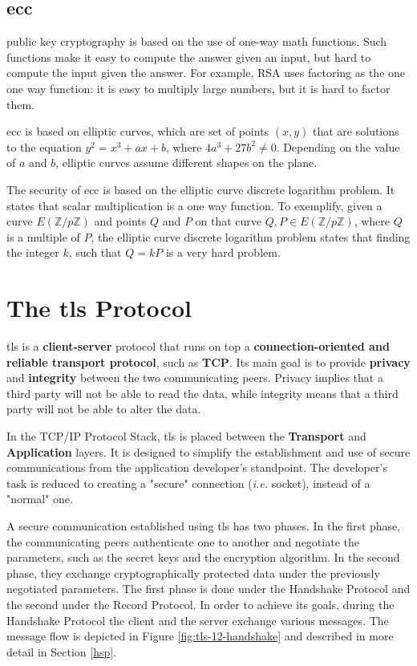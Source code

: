 \documentclass{llncs}
\begin{document}
\subsection{\gls{ecc}} \label{eccsection}

public key cryptography is based on the use of one-way math functions. Such
functions make it easy to compute the answer given an input,
but hard to compute the input given the answer. For example, RSA uses factoring
as the one one way function: it is easy to multiply large numbers, but it is hard
to factor them.

\gls{ecc} is based on elliptic curves, which are set of points $(x,y)$ that are
solutions to the equation $y^2 = x^3 + ax + b$, where $4a^3 + 27b^2 \neq 0$.
Depending on the value of $a$ and $b$, elliptic curves assume different shapes
on the plane.

The security of \gls{ecc} is based on the elliptic curve discrete logarithm
problem. It states that scalar multiplication is a one way function. To exemplify,
given a curve $E(\mathbb{Z}/p\mathbb{Z})$ and points $Q$ and $P$ on that curve
$Q,P \in E(\mathbb{Z}/p\mathbb{Z})$, where $Q$ is a multiple of $P$, the elliptic curve discrete logarithm problem
states that finding the integer $k$, such that $Q=kP$ is a very hard problem.

\section{The \gls{tls} Protocol}

\gls{tls} is a \textbf{client-server} protocol
that runs on top a \textbf{connection-oriented and reliable transport protocol},
such as \textbf{TCP}. Its main goal is to provide \textbf{privacy} and \textbf{integrity}
between the two communicating peers. Privacy implies that a third party will not
be able to read the data, while integrity means that a third party will not be
able to alter the data.

In the TCP/IP Protocol Stack, \gls{tls} is placed between the \textbf{Transport}
and \textbf{Application} layers. It is designed to simplify the establishment
and use of secure communications from the application developer's standpoint.
The developer's task is reduced to creating a "secure" connection (\textit{i.e.} socket), instead of a "normal" one.

A secure communication established using \gls{tls} has two phases. In the first
phase, the communicating peers authenticate one to another and negotiate the parameters, such as the secret keys and the encryption algorithm. In the
second phase, they exchange cryptographically protected data under
the previously negotiated parameters. The first phase is done under the
Handshake Protocol and the second under the Record Protocol. In order to
achieve its goals, during the Handshake Protocol the client and the server
exchange various messages. The message flow is depicted in Figure \ref{fig:tls-12-handshake} and described in more detail in Section
\ref{hsp}.
\end{document}
